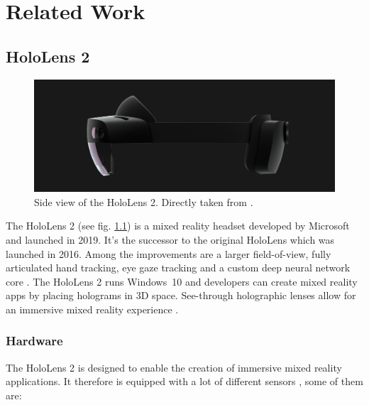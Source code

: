 \setcounter{chapter}{1}

\chapter{Related Work}

\section{HoloLens 2}

\begin{figure}
    \centering
    \includegraphics[width=0.9\linewidth]{figures/hololens.jpg}
    \caption[Side view of the HoloLens 2]{Side view of the HoloLens 2. Directly taken from \cite{HololensOverview}.}
      \label{fig:hololens}
\end{figure}

The HoloLens 2 (see fig. \ref{fig:hololens}) is a mixed reality headset developed by Microsoft and launched in 2019. It's the successor to the original HoloLens which was launched in 2016. Among the improvements are a larger field-of-view, fully articulated hand tracking, eye gaze tracking and a custom deep neural network core \cite{ResearchMode}. The HoloLens 2 runs Windows~10 and developers can create mixed reality apps by placing holograms in 3D space. See-through holographic lenses allow for an immersive mixed reality experience \cite{HololensHardware}.

\subsection{Hardware} \label{sec:holHardware}

The HoloLens 2 is designed to enable the creation of immersive mixed reality applications. It therefore is equipped with a lot of different sensors \cite{ResearchMode, HololensHardware}, some of them are:

